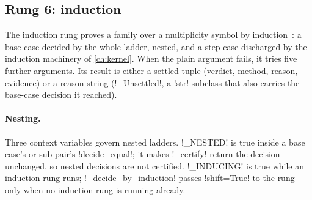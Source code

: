 \subsection{Rung 6: induction}\label{sec:proofs-rung-induction}

The induction rung proves a family over a multiplicity symbol by induction~\cite{kissinger2015firstorder}: a base case decided by the whole ladder, nested, and a step case discharged by the induction machinery of \cref{ch:kernel}. When the plain argument fails, it tries five further arguments. Its result is either a settled tuple (verdict, method, reason, evidence) or a reason string (\py!_Unsettled!, a \py!str! subclass that also carries the base-case decision it reached).

\paragraph{Nesting.} Three context variables govern nested ladders. \py!_NESTED! is true inside a base case's or sub-pair's \py!decide_equal!; it makes \py!_certify! return the decision unchanged, so nested decisions are not certified. \py!_INDUCING! is true while an induction rung runs; \py!_decide_by_induction! passes \py!shift=True! to the rung only when no induction rung is running already.


